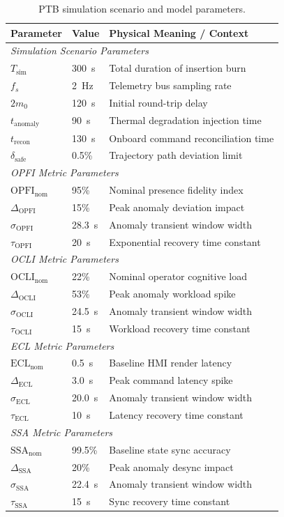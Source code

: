 \documentclass[ASNA,twocolumn]{USG}
\begin{document}
\begin{table}[htbp]
\centering
\caption{PTB simulation scenario and model parameters.}
\label{tab:parameters}
\begin{tabular}{lll}
\toprule
\textbf{Parameter} & \textbf{Value} & \textbf{Physical Meaning / Context} \\
\midrule
\multicolumn{3}{l}{\textit{Simulation Scenario Parameters}} \\
\midrule
$T_\text{sim}$ & 300~s & Total duration of insertion burn \\
$f_s$ & 2~Hz & Telemetry bus sampling rate \\
$2m_0$ & 120~s & Initial round-trip delay \\
$t_\text{anomaly}$ & 90~s & Thermal degradation injection time \\
$t_\text{recon}$ & 130~s & Onboard command reconciliation time \\
$\delta_\text{safe}$ & 0.5\% & Trajectory path deviation limit \\
\midrule
\multicolumn{3}{l}{\textit{OPFI Metric Parameters}} \\
\midrule
$\text{OPFI}_\text{nom}$ & 95\% & Nominal presence fidelity index \\
$\Delta_\text{OPFI}$ & 15\% & Peak anomaly deviation impact \\
$\sigma_\text{OPFI}$ & 28.3~s & Anomaly transient window width \\
$\tau_\text{OPFI}$ & 20~s & Exponential recovery time constant \\
\midrule
\multicolumn{3}{l}{\textit{OCLI Metric Parameters}} \\
\midrule
$\text{OCLI}_\text{nom}$ & 22\% & Nominal operator cognitive load \\
$\Delta_\text{OCLI}$ & 53\% & Peak anomaly workload spike \\
$\sigma_\text{OCLI}$ & 24.5~s & Anomaly transient window width \\
$\tau_\text{OCLI}$ & 15~s & Workload recovery time constant \\
\midrule
\multicolumn{3}{l}{\textit{ECL Metric Parameters}} \\
\midrule
$\text{ECL}_\text{nom}$ & 0.5~s & Baseline HMI render latency \\
$\Delta_\text{ECL}$ & 3.0~s & Peak command latency spike \\
$\sigma_\text{ECL}$ & 20.0~s & Anomaly transient window width \\
$\tau_\text{ECL}$ & 10~s & Latency recovery time constant \\
\midrule
\multicolumn{3}{l}{\textit{SSA Metric Parameters}} \\
\midrule
$\text{SSA}_\text{nom}$ & 99.5\% & Baseline state sync accuracy \\
$\Delta_\text{SSA}$ & 20\% & Peak anomaly desync impact \\
$\sigma_\text{SSA}$ & 22.4~s & Anomaly transient window width \\
$\tau_\text{SSA}$ & 15~s & Sync recovery time constant \\
\bottomrule
\end{tabular}
\end{table}
\end{document}

